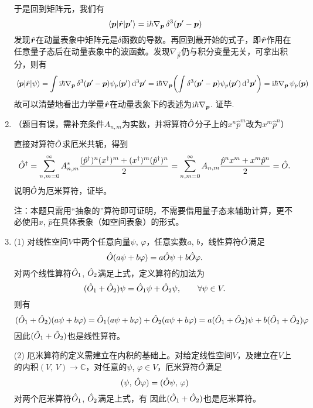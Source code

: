 \begin{enumerate}[label=2.\arabic*, leftmargin=-0.5mm]
于是回到矩阵元，我们有
\[\mel{\boldsymbol{p}}{\hat{\boldsymbol{r}}}{\boldsymbol{p}'} = \mathrm{i}\hbar\nabla_{\boldsymbol{p}}\,\delta^3(\boldsymbol{p}'-\boldsymbol{p})\]
{\color{red}发现$\hat{\boldsymbol{r}}$在动量表象中矩阵元是$\delta$函数的导数}。再回到最开始的式子，即$\hat{\boldsymbol{r}}$作用在任意量子态后在动量表象中的波函数。发现$\nabla_{\vec{p}}$仍与积分变量无关，可拿出积分，则有
\[\mel{\boldsymbol{p}}{\hat{\boldsymbol{r}}}{\psi} = \int \mathrm{i}\hbar\nabla_{\boldsymbol{p}}\,\delta^3(\boldsymbol{p}'-\boldsymbol{p}) \psi_p(\boldsymbol{p}')\dd[3]{\boldsymbol{p}'} = \mathrm{i}\hbar\nabla_{\boldsymbol{p}} \qty( \int \delta^3(\boldsymbol{p}'-\boldsymbol{p}) \psi_p(\boldsymbol{p}')\dd[3]{\boldsymbol{p}'}) = \mathrm{i}\hbar\nabla_{\boldsymbol{p}}\, \psi_p(\boldsymbol{p})\]
故可以清楚地看出力学量$\hat{\boldsymbol{r}}$在动量表象下的表述为$\mathrm{i}\hbar\nabla_{\boldsymbol{p}}$. 证毕.

\item
（题目有误，需补充条件$A_{n,m}$为实数，并将算符$\hat{O}$分子上的$x^n\hat{p}^m$改为$x^m\hat{p}^n$）

直接对算符$\hat{O}$求厄米共轭，得到
\[\hat{O}^\dagger = \sum_{n,m=0}^\infty A^*_{n,m}\frac{(\hat{p}^{\dagger})^n (x^{\dagger})^m +(x^{\dagger})^m (\hat{p}^{\dagger})^n}{2} 
= \sum_{n,m=0}^\infty A_{n,m}\frac{\hat{p}^{n}x^{m} +x^{m}\hat{p}^{n}}{2} = \hat{O}.\]
说明$\hat{O}$为厄米算符，证毕。

{\color{red}注：本题只需用“抽象的”算符即可证明，不需要借用量子态来辅助计算，更不必使用$x$, $\hat{p}$在具体表象（如空间表象）的形式。}

\item
(1) 对线性空间$V$中两个任意向量$\psi$, $\varphi$，任意实数$a$, $b$，线性算符$\hat{O}$满足
\[\hat{O}(a\psi+b\varphi) = a\hat{O}\psi + b\hat{O}\varphi.\]
对两个线性算符$\hat{O}_1$, $\hat{O}_2$满足上式，定义算符的加法为
\[(\hat{O}_1+\hat{O}_2)\psi = \hat{O}_1\psi + \hat{O}_2\psi,\qquad \forall \psi \in V.\]
则有
\[(\hat{O}_1+\hat{O}_2)(a\psi+b\varphi) = \hat{O}_1(a\psi+b\varphi) + \hat{O}_2(a\psi+b\varphi) = a(\hat{O}_1+\hat{O}_2)\psi + b(\hat{O}_1+\hat{O}_2)\varphi\]
因此$(\hat{O}_1+\hat{O}_2)$也是线性算符。

(2) 厄米算符的定义需建立在内积的基础上。对给定线性空间$V$，及建立在$V$上的内积$(V,\,V)\rightarrow \mathbb{C}$，对任意的$\psi$, $\varphi\in V$，厄米算符$\hat{O}$满足
\[(\psi,\,\hat{O}\varphi) = (\hat{O}\psi,\,\varphi)\]
对两个厄米算符$\hat{O}_1$, $\hat{O}_2$满足上式，有
因此$(\hat{O}_1+\hat{O}_2)$也是厄米算符。


\end{enumerate}
